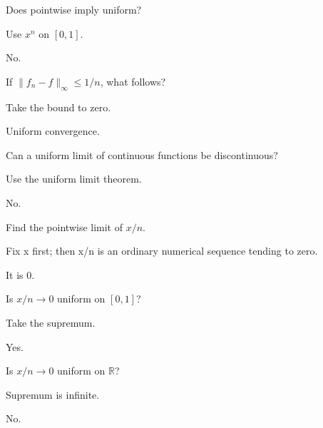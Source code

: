 \begin{exercise}\label{exr:ii11-02}
Does pointwise imply uniform?
\end{exercise}
\begin{hint}
Use $x^n$ on $[0,1]$.
\end{hint}
\begin{solution}
No.
\end{solution}

\begin{exercise}\label{exr:ii11-03}
If $\|f_n-f\|_\infty\le1/n$, what follows?
\end{exercise}
\begin{hint}
Take the bound to zero.
\end{hint}
\begin{solution}
Uniform convergence.
\end{solution}

\begin{exercise}\label{exr:ii11-04}
Can a uniform limit of continuous functions be discontinuous?
\end{exercise}
\begin{hint}
Use the uniform limit theorem.
\end{hint}
\begin{solution}
No.
\end{solution}

\begin{exercise}\label{exr:ii11-05}
Find the pointwise limit of $x/n$.
\end{exercise}
\begin{hint}
Fix x first; then x/n is an ordinary numerical sequence tending to zero.
\end{hint}
\begin{solution}
It is $0$.
\end{solution}

\begin{exercise}\label{exr:ii11-06}
Is $x/n\to0$ uniform on $[0,1]$?
\end{exercise}
\begin{hint}
Take the supremum.
\end{hint}
\begin{solution}
Yes.
\end{solution}

\begin{exercise}\label{exr:ii11-07}
Is $x/n\to0$ uniform on $\mathbb R$?
\end{exercise}
\begin{hint}
Supremum is infinite.
\end{hint}
\begin{solution}
No.
\end{solution}

